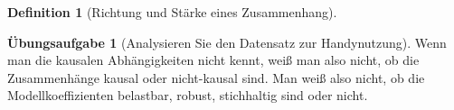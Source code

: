 \documentclass[
  a4paper,
  DIV=11]{scrreprt}
\theoremstyle{definition}
\newtheorem{exercise}{Übungsaufgabe}[chapter]
\theoremstyle{definition}
\theoremstyle{definition}
\newtheorem{definition}{Definition}[chapter]
\theoremstyle{remark}
\begin{document}
\begin{definition}[Richtung und Stärke eines
Zusammenhang]
\begin{exercise}[Analysieren Sie den Datensatz zur
Handynutzung]
Wenn man die kausalen Abhängigkeiten nicht kennt, weiß man also nicht,
ob die Zusammenhänge kausal oder nicht-kausal sind. Man weiß also nicht,
ob die Modellkoeffizienten belastbar, robust, stichhaltig sind oder
nicht.

\begin{figure}

\begin{minipage}{0.50\linewidth}



\end{minipage}%
%
\begin{minipage}{0.50\linewidth}

\end{minipage}
\end{figure}
\end{exercise}
\end{definition}
\end{document}
